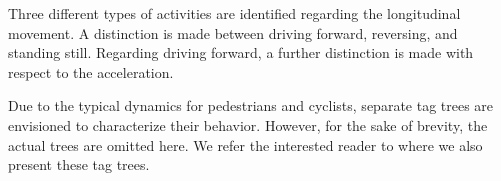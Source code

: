 Three different types of activities are identified regarding the longitudinal movement. A distinction is made between driving forward, reversing, and standing still. Regarding driving forward, a further distinction is made with respect to the acceleration.

Due to the typical dynamics for pedestrians and cyclists, separate tag trees are envisioned to characterize their behavior. However, for the sake of brevity, the actual trees are omitted here. We refer the interested reader to \autocite{degelder2019scenariocategories} where we also present these tag trees.
%
%
%



